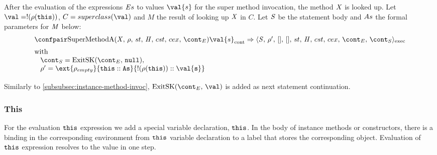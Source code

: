 \documentclass{article}
\newcommand{\cesktrans}[2]{\ensuremath{{#1} \Rightarrow {#2}}}
\begin{document}
After the evaluation of the expressions $\mathit{E}{s}$ to values $\val{s}$ for the super method invocation, the method $\mathit{X}$ is looked up.
Let $\val = \deref{(\env(\this))}$, $C = \superclass{\val}$ and $M$ the result of looking up $\mathit{X}$ in $C$.
Let $\mathit{S}$ be the statement body and $As$ the formal parameters for $\mathit{M}$ below:
\[
  \begin{array}{lcl}
	\cesktrans{
		\contconf{\SuperMethodA}{\val{s}}}{
		\execconf{\stmt}{\env'}{[]}{[]}{\handler}{\cstrace}{\cex}{\econt}{\scont}}
	\\[2mm]
	\textrm{with }\\
	\hspace{3mm}\scont = \ExitSK{\tt{null}},\\
	\hspace{3mm}\env' = \ext{\env_{empty}}{\this :: \formals}{\deref{(\env(\this))} :: \val{s}}\\[2mm]
  \end{array}
\]
Similarly to \ref{subsubsec:instance-method-invoc}, $\ExitSK{\val}$ is added as next statement continuation.

\subsubsection{This}
For the evaluation $\tt{this}$ expression we add a special variable declaration, $\tt{this}$.
In the body of instance methods or constructors, there is a binding in the corresponding environment from $\tt{this}$ variable declaration to a label that stores the corresponding object.
Evaluation of $\tt{this}$ expression resolves to the value in one step.
\end{document}

